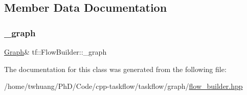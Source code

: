 \subsection{Member Data Documentation}
\mbox{\label{classtf_1_1FlowBuilder_a9404a57d9d37a4d49d20b686e4e5f68f}} 
\subsubsection{\texorpdfstring{\+\_\+graph}{\_graph}}
{\footnotesize\ttfamily \hyperlink{namespacetf_a2afa7da139285640eaf8122535136dc9}{Graph}\& tf\+::\+Flow\+Builder\+::\+\_\+graph\hspace{0.3cm}{\ttfamily [protected]}}



The documentation for this class was generated from the following file\+:\begin{DoxyCompactItemize}
\item 
/home/twhuang/\+Ph\+D/\+Code/cpp-\/taskflow/taskflow/graph/\hyperlink{flow__builder_8hpp}{flow\+\_\+builder.\+hpp}\end{DoxyCompactItemize}
